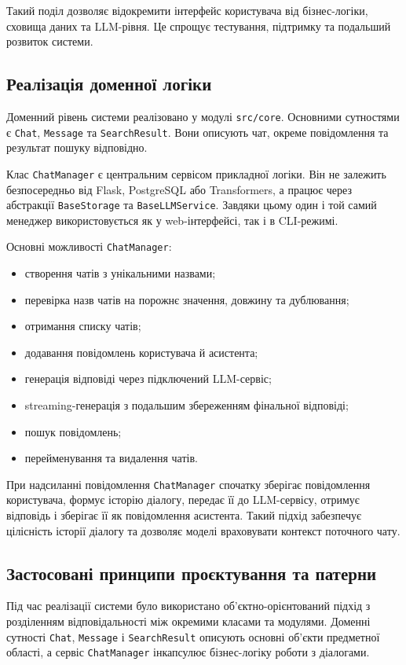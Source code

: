 Такий поділ дозволяє відокремити інтерфейс користувача від бізнес-логіки, сховища даних та LLM-рівня. Це спрощує тестування, підтримку та подальший розвиток системи.

\subsection{Реалізація доменної логіки}

Доменний рівень системи реалізовано у модулі \texttt{src/core}. Основними сутностями є \texttt{Chat}, \texttt{Message} та \texttt{SearchResult}. Вони описують чат, окреме повідомлення та результат пошуку відповідно.

Клас \texttt{ChatManager} є центральним сервісом прикладної логіки. Він не залежить безпосередньо від Flask, PostgreSQL або Transformers, а працює через абстракції \texttt{BaseStorage} та \texttt{BaseLLMService}. Завдяки цьому один і той самий менеджер використовується як у web-інтерфейсі, так і в CLI-режимі.

Основні можливості \texttt{ChatManager}:
\begin{itemize}
  \item створення чатів з унікальними назвами;
  \item перевірка назв чатів на порожнє значення, довжину та дублювання;
  \item отримання списку чатів;
  \item додавання повідомлень користувача й асистента;
  \item генерація відповіді через підключений LLM-сервіс;
  \item streaming-генерація з подальшим збереженням фінальної відповіді;
  \item пошук повідомлень;
  \item перейменування та видалення чатів.
\end{itemize}

При надсиланні повідомлення \texttt{ChatManager} спочатку зберігає повідомлення користувача, формує історію діалогу, передає її до LLM-сервісу, отримує відповідь і зберігає її як повідомлення асистента. Такий підхід забезпечує цілісність історії діалогу та дозволяє моделі враховувати контекст поточного чату.

\subsection{Застосовані принципи проєктування та патерни}

Під час реалізації системи було використано об'єктно-орієнтований підхід з розділенням відповідальності між окремими класами та модулями. Доменні сутності \texttt{Chat}, \texttt{Message} і \texttt{SearchResult} описують основні об'єкти предметної області, а сервіс \texttt{ChatManager} інкапсулює бізнес-логіку роботи з діалогами.

